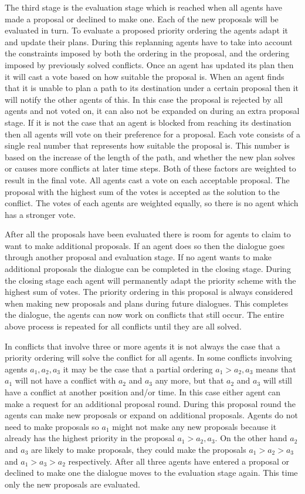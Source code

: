 The third stage is the evaluation stage which is reached when all agents have
made a proposal or declined to make one. Each of the new proposals will be
evaluated in turn. To evaluate a proposed priority ordering the agents adapt it
and update their plans. During this replanning agents have to take into account
the constraints imposed by both the ordering in the proposal, and the ordering
imposed by previously solved conflicts. Once an agent has updated its plan then
it will cast a vote based on how suitable the proposal is. When an agent finds
that it is unable to plan a path to its destination under a certain proposal
then it will notify the other agents of this. In this case the proposal is
rejected by all agents and not voted on, it can also not be expanded on during
an extra proposal stage. If it is not the case that an agent is blocked from
reaching its destination then all agents will vote on their preference for a
proposal. Each vote consists of a single real number that represents how
suitable the proposal is. This number is based on the increase of the length of
the path, and whether the new plan solves or causes more conflicts at later
time steps. Both of these factors are weighted to result in the final vote. All
agents cast a vote on each acceptable proposal. The proposal with the highest
sum of the votes is accepted as the solution to the conflict. The votes of each
agents are weighted equally, so there is no agent which has a stronger vote.

After all the proposals have been evaluated there is room for agents to claim
to want to make additional proposals. If an agent does so then the dialogue
goes through another proposal and evaluation stage. If no agent wants to make
additional proposals the dialogue can be completed in the closing stage. During
the closing stage each agent will permanently adapt the priority scheme with
the highest sum of votes. The priority ordering in this proposal is always
considered when making new proposals and plans during future dialogues. This
completes the dialogue, the agents can now work on conflicts that still occur.
The entire above process is repeated for all conflicts until they are all
solved.

In conflicts that involve three or more agents it is not always the case that a
priority ordering will solve the conflict for all agents. In some conflicts
involving agents $a_1, a_2, a_3$ it may be the case that a partial ordering
$a_1 > a_2, a_3$ means that $a_1$ will not have a conflict with $a_2$ and $a_3$
any more, but that $a_2$ and $a_3$ will still have a conflict at another
position and/or time. In this case either agent can make a request for an
additional proposal round. During this proposal round the agents can make new
proposals or expand on additional proposals. Agents do not need to make
proposals so $a_1$ might not make any new proposals because it already has the
highest priority in the proposal $a_1 > a_2, a_3$. On the other hand $a_2$ and
$a_3$ are likely to make proposals, they could make the proposals $a_1 > a_2 >
a_3$ and $a_1 > a_3 > a_2$ respectively. After all three agents have entered a
proposal or declined to make one the dialogue moves to the evaluation stage
again. This time only the new proposals are evaluated.

